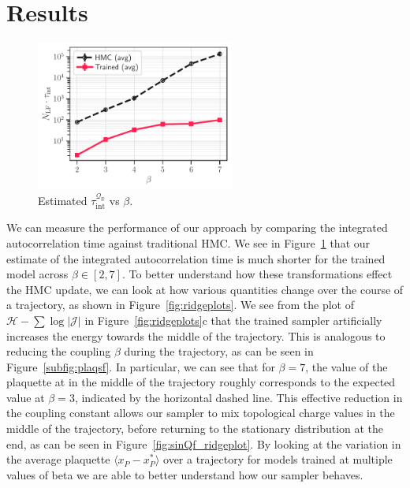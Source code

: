 \documentclass[a4paper,11pt]{article}
\begin{document}
\section{\label{sec:results}Results}
%
\begin{figure}
    \vspace{-\baselineskip}
    \centering
    \includegraphics[width=0.58\textwidth]{assets/autocorr_vs_beta.pdf}
    \caption{\label{fig:autocorr}Estimated
    \(\tau_{\mathrm{int}}^{\mathcal{Q}_{\mathbb{R}}}\) vs \(\beta\).}
\end{figure}
%
We can measure the performance of our approach by comparing the integrated
autocorrelation time against traditional HMC.
%
We see in Figure~\ref{fig:autocorr} that our estimate of the integrated
autocorrelation time is much shorter for the trained model across \(\beta \in
[2, 7]\).
%
To better understand how these transformations effect the HMC update, we can
look at how various quantities change over the course of a trajectory, as shown
in Figure~\ref{fig:ridgeplots}.
%
We see from the plot of \(\mathcal{H} - \sum \log | \mathcal{J} |\) in
Figure~\ref{fig:ridgeplots}c that the trained sampler artificially
increases the energy towards the middle of the trajectory.
%
This is analogous to reducing the coupling \(\beta\) during the trajectory, as
can be seen in Figure~\ref{subfig:plaqsf}.
%
In particular, we can see that for \(\beta = 7\), the value of the plaquette at
in the middle of the trajectory roughly corresponds to the expected value at
\(\beta = 3\), indicated by the horizontal dashed line.
%
This effective reduction in the coupling constant allows our sampler to mix
topological charge values in the middle of the trajectory, before returning to
the stationary distribution at the end, as can be seen in
Figure~\ref{fig:sinQf_ridgeplot}.
%
By looking at the variation in the average plaquette \(\langle x_{P} -
x^{\ast}_{P}\rangle\) over a trajectory for models trained at multiple values
of beta we are able to better understand how our sampler behaves.
\end{document}
